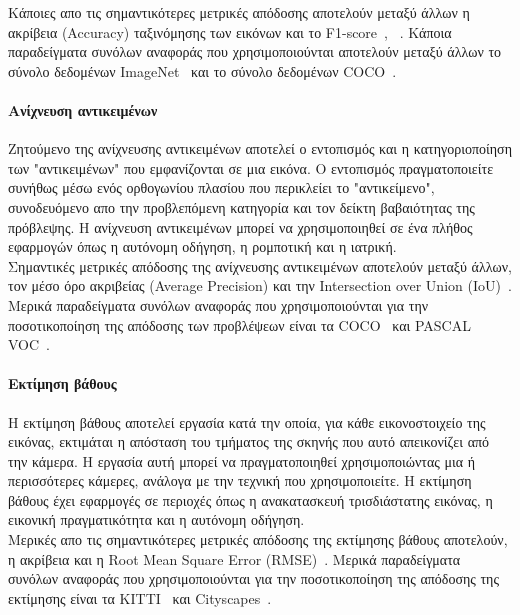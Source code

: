 \documentclass[12pt]{article}
\numberwithin{equation}{section}
\begin{document}
Κάποιες απο τις σημαντικότερες μετρικές απόδοσης αποτελούν μεταξύ άλλων η ακρίβεια (Accuracy) ταξινόμησης των εικόνων και το F1-score~\cite{article10}, ~\cite{Rainio2024}. Κάποια παραδείγματα συνόλων αναφοράς που χρησιμοποιούνται αποτελούν μεταξύ άλλων το σύνολο δεδομένων ImageNet~\cite{russakovsky2015imagenetlargescalevisual} και το σύνολο δεδομένων COCO~\cite{lin2015microsoftcococommonobjects}.\\

\paragraph{Ανίχνευση αντικειμένων \\ [0.5cm]}

Ζητούμενο της ανίχνευσης αντικειμένων αποτελεί ο εντοπισμός και η κατηγοριοποίηση των "αντικειμένων" που εμφανίζονται σε μια εικόνα. Ο εντοπισμός πραγματοποιείτε συνήθως μέσω ενός ορθογωνίου πλασίου που περικλείει το "αντικείμενο", συνοδευόμενο απο την προβλεπόμενη κατηγορία και τον δείκτη βαβαιότητας της πρόβλεψης. Η ανίχνευση αντικειμένων μπορεί να χρησιμοποιηθεί σε ένα πλήθος εφαρμογών όπως η αυτόνομη οδήγηση, η ρομποτική και η ιατρική.\\

Σημαντικές μετρικές απόδοσης της ανίχνευσης αντικειμένων αποτελούν μεταξύ άλλων, τον  μέσο όρο ακριβείας (Average Precision) και την Intersection over Union (IoU)~\cite{zou2023objectdetection20years}. Μερικά παραδείγματα συνόλων αναφοράς που χρησιμοποιούνται για την ποσοτικοποίηση της απόδοσης των προβλέψεων είναι τα COCO~\cite{lin2015microsoftcococommonobjects} και PASCAL VOC~\cite{Everingham2010}.\\

\paragraph{Εκτίμηση βάθους\\ [0.5 cm]}

Η εκτίμηση βάθους αποτελεί εργασία κατά την οποία, για κάθε εικονοστοιχείο της εικόνας, εκτιμάται η απόσταση του τμήματος της σκηνής που αυτό απεικονίζει από την κάμερα. Η εργασία αυτή μπορεί να πραγματοποιηθεί χρησιμοποιώντας μια ή περισσότερες κάμερες, ανάλογα με την τεχνική που χρησιμοποιείτε. Η εκτίμηση βάθους έχει εφαρμογές σε περιοχές όπως η ανακατασκευή τρισδιάστατης εικόνας, η εικονική πραγματικότητα και η αυτόνομη οδήγηση. \\

Μερικές απο τις σημαντικότερες μετρικές απόδοσης της εκτίμησης βάθους αποτελούν, η ακρίβεια και η Root Mean Square Error (RMSE)~\cite{rohan2025systematicliteraturereviewdeep}. Μερικά παραδείγματα συνόλων αναφοράς που χρησιμοποιούνται για την ποσοτικοποίηση της απόδοσης της εκτίμησης είναι τα KITTI~\cite{Geiger2013IJRR} και Cityscapes~\cite{DBLP:journals/corr/CordtsORREBFRS16}.\\
\end{document}
